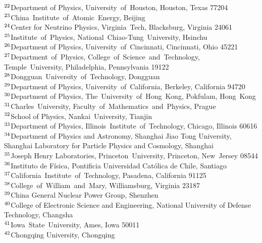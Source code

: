 {$^{22}$Department of Physics, University~of~Houston, Houston, Texas  77204 \\ 
$^{23}$China~Institute~of~Atomic~Energy, Beijing \\ 
$^{24}$Center for Neutrino Physics, Virginia~Tech, Blacksburg, Virginia  24061 \\ 
$^{25}$Institute~of~Physics, National~Chiao-Tung~University, Hsinchu \\ 
$^{26}$Department of Physics, University~of~Cincinnati, Cincinnati, Ohio 45221 \\ 
$^{27}$Department~of~Physics, College~of~Science~and~Technology, Temple~University, Philadelphia, Pennsylvania  19122 \\ 
$^{28}$Dongguan~University~of~Technology, Dongguan \\ 
$^{29}$Department of Physics, University~of~California, Berkeley, California  94720 \\ 
$^{30}$Department of Physics, The~University~of~Hong~Kong, Pokfulam, Hong~Kong \\ 
$^{31}$Charles~University, Faculty~of~Mathematics~and~Physics, Prague \\ 
$^{32}$School of Physics, Nankai~University, Tianjin \\ 
$^{33}$Department of Physics, Illinois~Institute~of~Technology, Chicago, Illinois  60616 \\ 
$^{34}$Department of Physics and Astronomy, Shanghai Jiao Tong University, Shanghai Laboratory for Particle Physics and Cosmology, Shanghai \\ 
$^{35}$Joseph Henry Laboratories, Princeton~University, Princeton, New~Jersey 08544 \\ 
$^{36}$Instituto de F\'isica, Pontificia Universidad Cat\'olica de Chile, Santiago \\ 
$^{37}$California~Institute~of~Technology, Pasadena, California 91125 \\ 
$^{38}$College~of~William~and~Mary, Williamsburg, Virginia  23187 \\ 
$^{39}$China General Nuclear Power Group, Shenzhen \\ 
$^{40}$College of Electronic Science and Engineering, National University of Defense Technology, Changsha \\ 
$^{41}$Iowa~State~University, Ames, Iowa  50011 \\ 
$^{42}$Chongqing University, Chongqing \\ 
} 
